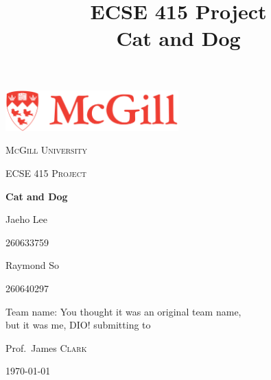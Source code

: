\documentclass[conference,compsoc]{IEEEtran}
\begin{document}
\begin{titlepage}
	\centering
	\includegraphics[width=0.5\textwidth]{McGill_Logo}\par\vspace{1cm}
	{\scshape\LARGE McGill University \par}
	\vspace{1cm}
	{\scshape\Large ECSE 415 Project\par}
	\vspace{1.5cm}
	{\huge\bfseries Cat and Dog\par}
	\vspace{2cm}
	{\Large Jaeho Lee\par}
	{ 260633759\par} {\Large Raymond So \par} {260640297 \par}{Team name: You thought it was an original team name, \\but it was me, DIO!}
	\vfill
	submitting to\par
	Prof.~James \textsc{Clark}

	\vfill

	{\large \today\par}
\end{titlepage}
%
\title{ECSE 415 Project\\ Cat and Dog}
\author{
}

\maketitle



\IEEEpeerreviewmaketitle
\end{document}
